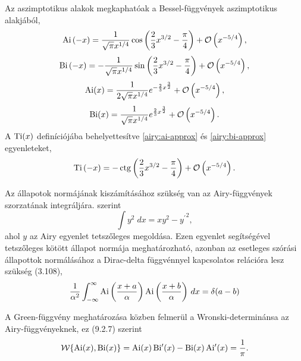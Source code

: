 Az aszimptotikus alakok megkaphatóak a Bessel-függvények aszimptotikus alakjából, 
\begin{equation}
	\operatorname{Ai}\left(-x\right) = \frac{1}{\sqrt{\pi}x^{1/4}}\cos\left(\frac{2}{3}x^{3/2} - \frac{\pi}{4}\right) + \mathcal{O}\left(x^{-5/4}\right),
	\label{airy:ai-approx}
\end{equation}
\begin{equation}
	\operatorname{Bi}\left(-x\right) = -\frac{1}{\sqrt{\pi}x^{1/4}}\sin\left(\frac{2}{3}x^{3/2} - \frac{\pi}{4}\right) + \mathcal{O}\left(x^{-5/4}\right),
	\label{airy:bi-approx}
\end{equation}
\begin{equation}
	\operatorname{Ai}(x) = \frac{1}{2\sqrt{\pi}x^{1/4}}e^{-\frac{2}{3}x^{\frac{3}{2}}}+\mathcal{O}\left(x^{-5/4}\right),
	\label{airy:ai+approx}
\end{equation}
\begin{equation}
	\operatorname{Bi}(x) = \frac{1}{ \sqrt{\pi}x^{1/4}}e^{ \frac{2}{3}x^{\frac{3}{2}}}+\mathcal{O}\left(x^{-5/4}\right).
	\label{airy:bi+approx}
\end{equation}
A $\operatorname{Ti}(x)$ definíciójába behelyettesítve \eqref{airy:ai-approx} és \eqref{airy:bi-approx} egyenleteket,
\begin{equation}
	\operatorname{Ti}\left(-x\right) = -\operatorname{ctg}\left( \frac{2}{3}x^{3/2} - \frac{\pi}{4} \right) + \mathcal{O}\left(x^{-5/4}\right).
	\label{airy:tiapprox}
\end{equation}

Az állapotok normájának kiszámításához szükség van az Airy-függvények szorzatának integráljára. \cite[A.16]{Albright_1977} szerint
\begin{equation}
	\int y^2\;dx = xy^2 - {y^\prime}^2,
	\label{airy:normintegral}
\end{equation}
ahol $y$ az Airy egyenlet tetszőleges megoldása. Ezen egyenlet segítségével tetszőleges kötött állapot normája meghatározható, azonban az esetleges szórási állapottok normálásához a Dirac-delta függvénnyel kapcsolatos relációra lesz szükség \cite{Vallee:2010:AFA} (3.108),
\begin{equation}
	\frac{1}{\alpha^2}\int_{-\infty}^\infty\operatorname{Ai}\left(\frac{x+a}{\alpha}\right)\operatorname{Ai}\left(\frac{x+b}{\alpha}\right)\,dx=\delta(a-b)
	\label{airy:delta}
\end{equation}

A Green-függvény meghatározása közben felmerül a Wronski-determinánsa az Airy-függvényeknek, ez \cite{NIST:DLMF} (9.2.7) szerint
\begin{equation}
	\mathcal{W} \{ \operatorname{Ai}(x), \operatorname{Bi}(x) \} = \operatorname{Ai}(x)\operatorname{Bi^\prime}(x) - \operatorname{Bi}(x)\operatorname{Ai^\prime}(x) = \frac{1}{\pi}.
	\label{airy:wronski}
\end{equation}








